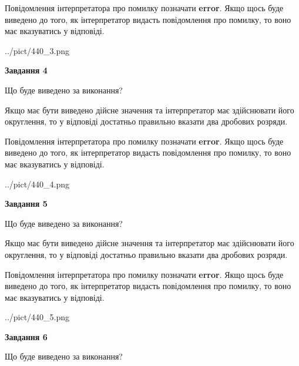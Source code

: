 \documentclass[12pt, ukrainian]{article}
\begin{document}
{\begin {Large}
Повідомлення інтерпретатора про помилку позначати \textbf{error}.
Якщо щось буде виведено до того, як інтерпретатор видасть повідомлення про помилку, 
то воно має вказуватись у відповіді. \par

\begin{center}
	{../pict/440_3.png}
\end{center}
\newpage

{\begin {center}\textbf{Завдання 4}\end {center}}\par
Що буде виведено за виконання? \par

Якщо має бути виведено дійсне значення та інтерпретатор має здійснювати його округлення, 
то у відповіді достатньо правильно вказати два дробових розряди.

Повідомлення інтерпретатора про помилку позначати \textbf{error}.
Якщо щось буде виведено до того, як інтерпретатор видасть повідомлення про помилку, 
то воно має вказуватись у відповіді. \par

\begin{center}
	{../pict/440_4.png}
\end{center}
\newpage

{\begin {center}\textbf{Завдання 5}\end {center}}\par
Що буде виведено за виконання? \par

Якщо має бути виведено дійсне значення та інтерпретатор має здійснювати його округлення, 
то у відповіді достатньо правильно вказати два дробових розряди.

Повідомлення інтерпретатора про помилку позначати \textbf{error}.
Якщо щось буде виведено до того, як інтерпретатор видасть повідомлення про помилку, 
то воно має вказуватись у відповіді. \par

\begin{center}
	{../pict/440_5.png}
\end{center}
\newpage

{\begin {center}\textbf{Завдання 6}\end {center}}\par
Що буде виведено за виконання? \par


\end{Large}}
\end{document}
